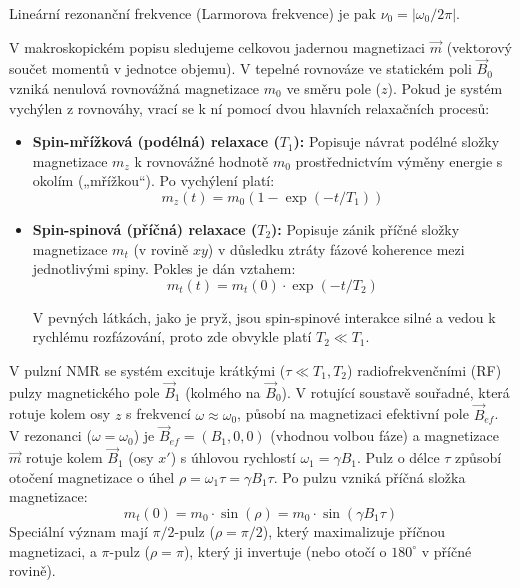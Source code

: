 Lineární rezonanční frekvence (Larmorova frekvence) je pak $\nu_0 = |\omega_0 / 2\pi|$.

V makroskopickém popisu sledujeme celkovou jadernou magnetizaci $\vec{m}$ (vektorový součet momentů v jednotce objemu). V tepelné rovnováze ve statickém poli $\vec{B}_0$ vzniká nenulová rovnovážná magnetizace $m_0$ ve směru pole ($z$). Pokud je systém vychýlen z rovnováhy, vrací se k ní pomocí dvou hlavních relaxačních procesů:
\begin{itemize}
    \item \textbf{Spin-mřížková (podélná) relaxace ($T_1$):} Popisuje návrat podélné složky magnetizace $m_z$ k rovnovážné hodnotě $m_0$ prostřednictvím výměny energie s okolím („mřížkou“). Po vychýlení platí:
    \begin{equation} \label{eq:T1_relax}
    m_z(t) = m_0 (1 - \exp(-t/T_1)) \tag{8}
    \end{equation}
    
    \item \textbf{Spin-spinová (příčná) relaxace ($T_2$):} Popisuje zánik příčné složky magnetizace $m_t$ (v rovině $xy$) v důsledku ztráty fázové koherence mezi jednotlivými spiny. Pokles je dán vztahem:
    \begin{equation} \label{eq:T2_relax}
    m_t(t) = m_t(0) \cdot \exp(-t/T_2) \tag{9}
    \end{equation}
    
    V pevných látkách, jako je pryž, jsou spin-spinové interakce silné a vedou k rychlému rozfázování, proto zde obvykle platí $T_2 \ll T_1$.
\end{itemize}

V pulzní NMR se systém excituje krátkými ($\tau \ll T_1, T_2$) radiofrekvenčními (RF) pulzy magnetického pole $\vec{B}_1$ (kolmého na $\vec{B}_0$). V rotující soustavě souřadné, která rotuje kolem osy $z$ s frekvencí $\omega \approx \omega_0$, působí na magnetizaci efektivní pole $\vec{B}_{ef}$. V rezonanci ($\omega = \omega_0$) je $\vec{B}_{ef} = (B_1, 0, 0)$ (vhodnou volbou fáze) a magnetizace $\vec{m}$ rotuje kolem $\vec{B}_1$ (osy $x'$) s úhlovou rychlostí $\omega_1 = \gamma B_1$. Pulz o délce $\tau$ způsobí otočení magnetizace o úhel $\rho = \omega_1 \tau = \gamma B_1 \tau$. Po pulzu vzniká příčná složka magnetizace:
\begin{equation} \label{eq:FID_amp}
m_t(0) = m_0 \cdot \sin(\rho) = m_0 \cdot \sin(\gamma B_1 \tau) \tag{14}
\end{equation}
Speciální význam mají $\pi/2$-pulz ($\rho = \pi/2$), který maximalizuje příčnou magnetizaci, a $\pi$-pulz ($\rho = \pi$), který ji invertuje (nebo otočí o $180^\circ$ v příčné rovině).

